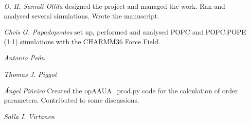 \documentclass[journal=jpcbfk]{achemso}
\begin{document}
\noindent
{\it O. H. Samuli Ollila}
designed the project and managed the work.
Ran and analysed several simulations. Wrote the manuscript.

\noindent
{\it Chris G. Papadopoulos} set up, performed and analysed POPC and POPC:POPE (1:1) simulations with the CHARMM36 Force Field.

\noindent
{\it Antonio Pe{\'o}n}

\noindent
{\it Thomas J. Piggot}

\noindent
{\it {\'A}ngel Pi{\~n}eiro}
Created the opAAUA\_prod.py code for the calculation of order parameters. Contributed to some discussions. 

\noindent
{\it Salla I. Virtanen}


\end{document}

